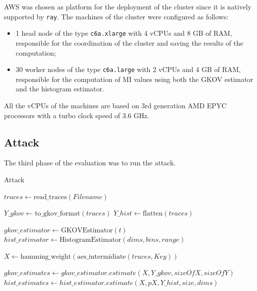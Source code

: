 \documentclass[12pt]{article}
\begin{document}
    AWS was chosen as platform for the deployment of the cluster since it is natively supported by \texttt{ray}.
    The machines of the cluster were configured as follows:
    \begin{itemize}
        \item 1 head node of the type \texttt{c6a.xlarge} with 4 vCPUs and 8 GB of RAM, responsible for the coordination of the cluster and saving the results of the computation;
        \item 30 worker nodes of the type \texttt{c6a.large} with 2 vCPUs and 4 GB of RAM, responsible for the computation of MI values using both the GKOV estimator and the histogram estimator.
    \end{itemize}
    All the vCPUs of the machines are based on 3rd generation AMD EPYC processors with a turbo clock speed of 3.6 GHz.

    \subsection{Attack}\label{subsec:phase3}
    The third phase of the evaluation was to run the attack.

    \begin{algorithm}
        \caption{Attack}\label{alg:attack}
        \begin{algorithmic}[1]
            \State $traces \gets \text{read\_traces}(Filename)$

            \State $Y\_gkov \gets \text{to\_gkov\_format}(traces)$ 
            \State $Y\_hist \gets \text{flatten}(traces)$ 

            \State $gkov\_estimator \gets \text{GKOVEstimator}(t)$
            \State $hist\_estimator \gets \text{HistogramEstimator}(dims, bins, range)$

            \State $X \gets \text{hamming\_weight}(\text{aes\_intermidiate}(traces, Key))$ 

            \State $gkov\_estimates \gets gkov\_estimator.estimate(X, Y\_gkov, sizeOfX, sizeOfY)$ 
            \State $hist\_estimates \gets hist\_estimator.estimate(X, pX, Y\_hist, size, dims)$ 
        \end{algorithmic}
    \end{algorithm}
\end{document}
